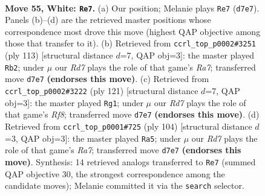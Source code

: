 \documentclass[11pt]{article}
\begin{document}
\clearpage

\begin{figure}[p]\centering
\begin{subfigure}{0.46\textwidth}\centering
\resizebox{\linewidth}{!}{%
\newchessgame
\chessboard[
  setfen={5rk1/3R4/8/P7/8/7K/8/8 w - - 13 55},
  showmover=false,
  pgfstyle=straightmove, color=movearrow, markmove={d7-e7}
]}
\caption{}
\end{subfigure}\hfill
\begin{subfigure}{0.46\textwidth}\centering
\resizebox{\linewidth}{!}{%
\newchessgame
\chessboard[
  setfen={8/8/8/5k1p/7P/8/r7/6RK b - - 4 57},
  showmover=false,
  pgfstyle=straightmove, color=movearrow, markmove={a2-b2}
]}
\caption{}
\end{subfigure}
\\[4pt]
\begin{subfigure}{0.46\textwidth}\centering
\resizebox{\linewidth}{!}{%
\newchessgame
\chessboard[
  setfen={4K3/4R1P1/8/8/1p1k4/8/8/5r2 b - - 20 61},
  showmover=false,
  pgfstyle=straightmove, color=movearrow, markmove={f1-g1}
]}
\caption{}
\end{subfigure}\hfill
\begin{subfigure}{0.46\textwidth}\centering
\resizebox{\linewidth}{!}{%
\newchessgame
\chessboard[
  setfen={8/R7/3rk3/6p1/6P1/8/6K1/8 w - - 3 53},
  showmover=false,
  pgfstyle=straightmove, color=movearrow, markmove={a7-a5}
]}
\caption{}
\end{subfigure}
\caption{\textbf{Move 55, White: \texttt{Re7}.} (a) Our position; Melanie plays \texttt{Re7} (\texttt{d7e7}). Panels (b)--(d) are the retrieved master positions whose correspondence most drove this move (highest QAP objective among those that transfer to it). (b) Retrieved from \texttt{ccrl\_top\_p0002\#3251} (ply 113) [structural distance $d$=7, QAP obj=3]: the master played \texttt{Rb2}; under $\mu$ our \emph{Rd7} plays the role of that game's \emph{Ra7}; transferred move \texttt{d7e7} \textbf{(endorses this move)}. (c) Retrieved from \texttt{ccrl\_top\_p0002\#3222} (ply 121) [structural distance $d$=7, QAP obj=3]: the master played \texttt{Rg1}; under $\mu$ our \emph{Rd7} plays the role of that game's \emph{Rf8}; transferred move \texttt{d7e7} \textbf{(endorses this move)}. (d) Retrieved from \texttt{ccrl\_top\_p0001\#725} (ply 104) [structural distance $d$=3, QAP obj=3]: the master played \texttt{Ra5}; under $\mu$ our \emph{Rd7} plays the role of that game's \emph{Ra7}; transferred move \texttt{d7e7} \textbf{(endorses this move)}. Synthesis: 14 retrieved analogs transferred to \texttt{Re7} (summed QAP objective 30, the strongest correspondence among the candidate moves); Melanie committed it via the \texttt{search} selector.}
\label{fig:thought-m108}
\end{figure}
\end{document}
